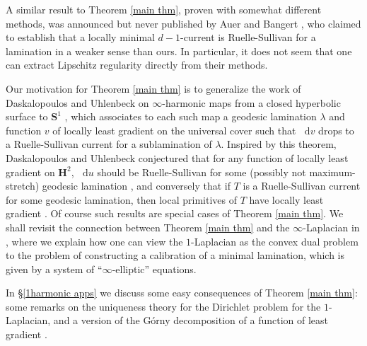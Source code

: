 \documentclass[reqno,11pt]{amsart}
\newcommand{\Hyp}{\mathbf H}
\newcommand{\Sph}{\mathbf S}
\newcommand*\dif{\mathop{}\!\mathrm{d}}
\theoremstyle{definition}
\numberwithin{equation}{section}
\begin{document}
A similar result to Theorem \ref{main thm}, proven with somewhat different methods, was announced but never published by Auer and Bangert \cite{Auer01, Auer12}, who claimed to establish that a locally minimal $d - 1$-current is Ruelle-Sullivan for a lamination in a weaker sense than ours.
In particular, it does not seem that one can extract Lipschitz regularity directly from their methods.

Our motivation for Theorem \ref{main thm} is to generalize the work of Daskalopoulos and Uhlenbeck on $\infty$-harmonic maps from a closed hyperbolic surface to $\Sph^1$ \cite{daskalopoulos2020transverse}, which associates to each such map a geodesic lamination $\lambda$ and function $v$ of locally least gradient on the universal cover such that $\dif v$ drops to a Ruelle-Sullivan current for a sublamination of $\lambda$.
Inspired by this theorem, Daskalopoulos and Uhlenbeck conjectured that for any function of locally least gradient on $\Hyp^2$, $\dif u$ should be Ruelle-Sullivan for some (possibly not maximum-stretch) geodesic lamination \cite[Problem 9.4]{daskalopoulos2020transverse}, and conversely that if $T$ is a Ruelle-Sullivan current for some geodesic lamination, then local primitives of $T$ have locally least gradient \cite[Conjecture 9.5]{daskalopoulos2020transverse}.
Of course such results are special cases of Theorem \ref{main thm}.
We shall revisit the connection between Theorem \ref{main thm} and the $\infty$-Laplacian in \cite{BackusInfinityMaxwell1}, where we explain how one can view the $1$-Laplacian as the convex dual problem to the problem of constructing a calibration of a minimal lamination, which is given by a system of ``$\infty$-elliptic'' equations.

In \S\ref{1harmonic apps} we discuss some easy consequences of Theorem \ref{main thm}: some remarks on the uniqueness theory for the Dirichlet problem for the $1$-Laplacian, and a version of the G\'orny decomposition of a function of least gradient \cite[Theorem 1.2]{górny2017planar}.
\end{document}

